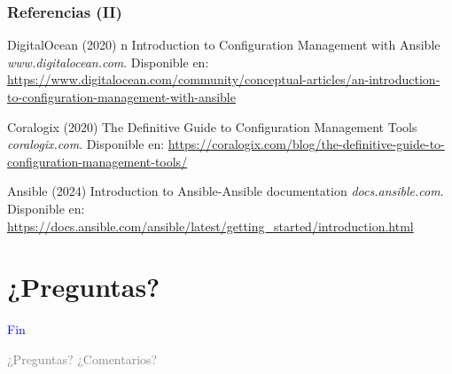 \documentclass[
	11pt, %
]{beamer}
\begin{document}
\begin{frame} %
	\frametitle{Referencias (II)}
	
	\begin{thebibliography}{99} %
		\footnotesize %
		
				DigitalOcean (2020)
                n {I}ntroduction to {C}onfiguration {M}anagement with {A}nsible
                \newblock \emph{www.digitalocean.com}. Disponible en: \url{https://www.digitalocean.com/community/conceptual-articles/an-introduction-to-configuration-management-with-ansible}
   
                Coralogix (2020)
                \newblock The Definitive Guide to Configuration Management Tools
                \newblock \emph{coralogix.com}. Disponible en: \url{https://coralogix.com/blog/the-definitive-guide-to-configuration-management-tools/}
            
                Ansible (2024)
                \newblock Introduction to Ansible-Ansible documentation
                \newblock \emph{docs.ansible.com}. Disponible en: \url{https://docs.ansible.com/ansible/latest/getting_started/introduction.html}

	\end{thebibliography}
\end{frame}


\section{¿Preguntas?}

\begin{frame}[plain]
	\begin{center}
		{\Huge \textcolor{blue}{Fin}}
		
		\bigskip\bigskip
		
		{\LARGE \textcolor{gray}{¿Preguntas? ¿Comentarios?}}
	\end{center}
\end{frame}

\end{document}
